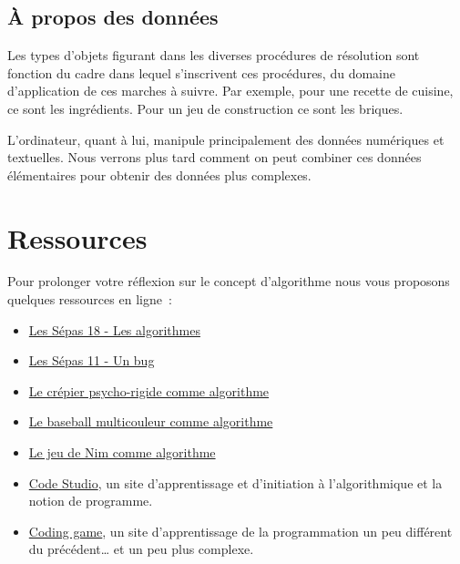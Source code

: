 		\subsection{À propos des données}
		
			Les types d’objets figurant 
			dans les diverses procédures de résolution
			sont fonction du cadre 
			dans lequel s’inscrivent ces procédures, 
			du domaine d’application de ces marches à suivre. 
			Par exemple, pour une recette de cuisine, 
			ce sont les ingrédients. 
			Pour un jeu de construction ce sont les briques.
			
			L’ordinateur, quant à lui, manipule principalement
			des données numériques et textuelles. 
			Nous verrons plus tard 
			comment on peut combiner ces données élémentaires 
			pour obtenir des données plus complexes.
	
	\section{Ressources}
	
		Pour prolonger votre réflexion sur le concept d’algorithme
		nous vous proposons quelques ressources en ligne~:
		\begin{itemize}
		\item
			\href{https://www.youtube.com/watch?v=hG9Jty7P6Es}
			{Les Sépas 18 - Les algorithmes}
		\item
			\href{https://www.youtube.com/watch?v=deI0GV5sWTY}
			{Les Sépas 11 - Un bug}
		\item
			\href{https://pixees.fr/?p=446}
			{Le crépier psycho-rigide comme algorithme}
		\item
			\href{https://pixees.fr/?p=450}
			{Le baseball multicouleur comme algorithme}
		\item
			\href{https://pixees.fr/?p=443}
			{Le jeu de Nim comme algorithme}
		\item 
			\href{http://studio.code.org/}{Code Studio}, un site d'apprentissage 
			et d'initiation à l'algorithmique et la notion de programme. 
		\item \href{https://www.codingame.com}{Coding game}, un site 
			d'apprentissage de la programmation un peu différent du précédent… 
			et un peu plus complexe.
		\end{itemize}
		

